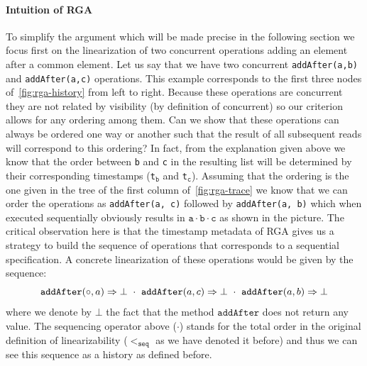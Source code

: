 \paragraph{Intuition of RGA \CRDTLinshort{}}
To simplify the argument which will be made precise in the following
section we focus first on the linearization of two concurrent
operations adding an element after a common element.
%
Let us say that we have two concurrent \lstinline|addAfter(a,b)| and
\lstinline|addAfter(a,c)| operations.
%
This example corresponds to the first three nodes
of~\autoref{fig:rga-history} from left to right.
%
Because these operations are concurrent they are not related by
visibility (by definition of concurrent) so our criterion allows for
any ordering among them.
%
Can we show that these operations can always be ordered one way or
another such that the result of all subsequent reads will correspond
to this ordering?
%
In fact, from the explanation given above we know that the order
between \lstinline|b| and \lstinline|c| in the resulting list will be
determined by their corresponding timestamps
(\lstinline|t|$_{\mathtt{b}}$ and \lstinline|t|$_{\mathtt{c}}$).
%
Assuming that the ordering is the one given in the tree of the first
column of~\autoref{fig:rga-trace} we know that we can order the
operations as \lstinline|addAfter(a, c)| followed by
\lstinline|addAfter(a, b)| which when executed sequentially obviously
results in $\mathtt{a \cdot b \cdot c}$ as shown in the picture.
%
The critical observation here is that the timestamp metadata of RGA
gives us a strategy to build the sequence of operations that
corresponds to a sequential specification.
%
A concrete linearization of these operations would be given by the
sequence:
\[\alabellong[\mathtt{addAfter}]{\circ,a}{\bot}\ \cdot\
\alabellong[\mathtt{addAfter}]{a,c}{\bot}\ \cdot\
\alabellong[\mathtt{addAfter}]{a,b}{\bot}
\]
where we denote by $\bot$ the fact that the method $\mathtt{addAfter}$
does not return any value.
%
The sequencing operator above ($\cdot$) stands for the total order in
the original definition of linearizability ($<_{\mathtt{seq}}$ as we
have denoted it before) and thus we can see this sequence as a history
as defined before.

